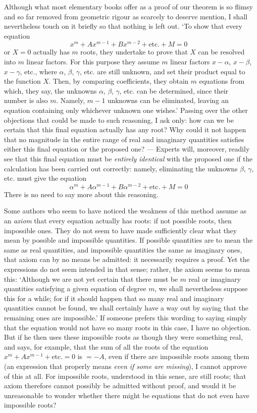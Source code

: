 Although what most elementary books offer as a proof of our theorem is so flimsy and so far removed from geometric rigour as scarcely to deserve mention, I shall nevertheless touch on it briefly so that nothing is left out. `To show that every equation
\[
x^m+Ax^{m-1}+Bx^{m-2}+\text{etc.}+M=0
\]
or $X=0$ actually has $m$ roots, they undertake to prove that $X$ can be resolved into $m$ linear factors. For this purpose they assume $m$ linear factors $x-\alpha$, $x-\beta$, $x-\gamma$, etc., where $\alpha$, $\beta$, $\gamma$, etc. are still unknown, and set their product equal to the function $X$. Then, by comparing coefficients, they obtain $m$ equations from which, they say, the unknowns $\alpha$, $\beta$, $\gamma$, etc. can be determined, since their number is also $m$. Namely, $m-1$ unknowns can be eliminated, leaving an equation containing only whichever unknown one wishes.' Passing over the other objections that could be made to such reasoning, I ask only: how can we be certain that this final equation actually has any root? Why could it not happen that no magnitude in the entire range of real and imaginary quantities satisfies either this final equation or the proposed one? --- Experts will, moreover, readily see that this final equation must be \textit{entirely identical} with the proposed one if the calculation has been carried out correctly: namely, eliminating the unknowns $\beta$, $\gamma$, etc. must give the equation
\[
\alpha^m+A\alpha^{m-1}+B\alpha^{m-2}+\text{etc.}+M=0
\]
There is no need to say more about this reasoning.

Some authors who seem to have noticed the weakness of this method assume as an \textit{axiom} that every equation actually has roots: if not possible roots, then impossible ones. They do not seem to have made sufficiently clear what they mean by possible and impossible quantities. If possible quantities are to mean the same as real quantities, and impossible quantities the same as imaginary ones, that axiom can by no means be admitted: it necessarily requires a proof. Yet the expressions do not seem intended in that sense; rather, the axiom seems to mean this: `Although we are not yet certain that there must be $m$ real or imaginary quantities satisfying a given equation of degree $m$, we shall nevertheless suppose this for a while; for if it should happen that so many real and imaginary quantities cannot be found, we shall certainly have a way out by saying that the remaining ones are impossible.' If someone prefers this wording to saying simply that the equation would not have so many roots in this case, I have no objection. But if he then uses these impossible roots as though they were something real, and says, for example, that the sum of all the roots of the equation $x^m+Ax^{m-1}+\text{etc.}=0$ is $=-A$, even if there are impossible roots among them (an expression that properly means \textit{even if some are missing}), I cannot approve of this at all. For impossible roots, understood in this sense, are still roots; that axiom therefore cannot possibly be admitted without proof, and would it be unreasonable to wonder whether there might be equations that do not even have impossible roots?

